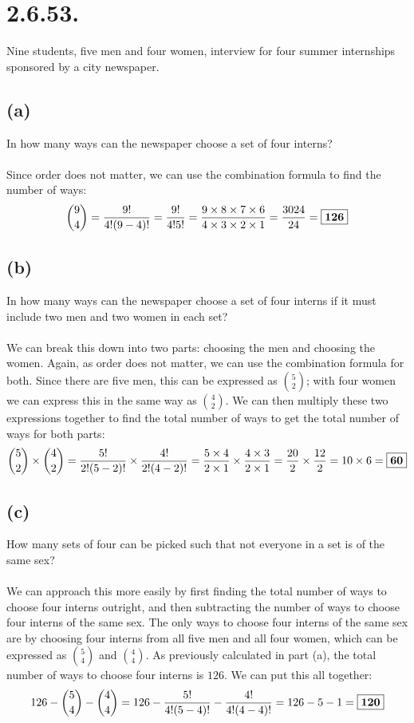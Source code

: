 \documentclass{article}
\begin{document}
{\section*{2.6.53.} 
Nine students, five men and four women, interview for four summer internships sponsored by a city newspaper.

\subsection*{(a)} 
In how many ways can the newspaper choose a set of four interns?
\\
\\
Since order does not matter, we can use the combination formula to find the number of ways:
\[
\binom{9}{4} = \frac{9!}{4!(9-4)!} = \frac{9!}{4!5!} = \frac{9 \times 8 \times 7 \times 6}{4 \times 3 \times 2 \times 1} = \frac{3024}{24} = \fbox{\textbf{126}}
\]

\subsection*{(b)} 
In how many ways can the newspaper choose a set of four interns if it must include two men and two women in each set?
\\
\\
We can break this down into two parts: choosing the men and choosing the women. Again, as order does not matter, we can use the combination formula for both. Since there are five men, this can be expressed as \(\binom{5}{2}\); with four women we can express this in the same way as \(\binom{4}{2}\). We can then multiply these two expressions together to find the total number of ways to get the total number of ways for both parts:
\[
\binom{5}{2} \times \binom{4}{2} = \frac{5!}{2!(5-2)!} \times \frac{4!}{2!(4-2)!} = \frac{5 \times 4}{2 \times 1} \times \frac{4 \times 3}{2 \times 1} = \frac{20}{2} \times \frac{12}{2} = 10 \times 6 = \fbox{\textbf{60}}
\]

\subsection*{(c)} 
How many sets of four can be picked such that not everyone in a set is of the same sex?
\\
\\
We can approach this more easily by first finding the total number of ways to choose four interns outright, and then subtracting the number of ways to choose four interns of the same sex. The only ways to choose four interns of the same sex are by choosing four interns from all five men and all four women, which can be expressed as \(\binom{5}{4}\) and \(\binom{4}{4}\). As previously calculated in part (a), the total number of ways to choose four interns is \(126\). We can put this all together: 
\[
126 - \binom{5}{4} - \binom{4}{4} = 126 - \frac{5!}{4!(5-4)!} - \frac{4!}{4!(4-4)!} = 126 - 5 - 1 =  \fbox{\textbf{120}}
\]

}
\end{document}
